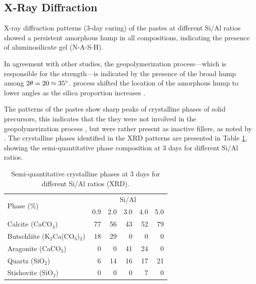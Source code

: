 \subsection{X-Ray Diffraction}

X-ray diffraction patterns (3-day curing) of the pastes at different Si/Al ratios showed a persistent amorphous hump in all compositions, indicating the presence of aluminosilicate gel (N-A-S-H).

In agreement with other studies, the geopolymerization process—which is responsible for the strength—is indicated by the presence of the broad hump among $2\theta = 20 \approx 35^{\circ}$.
process shifted the location of the amorphous hump to lower angles as the silica proportion increases \cite{arellano2014geopolymer,lee2017strength, wan2017geopolymerization}.

The patterns of the pastes show sharp peaks of crystalline phases of solid precursors, this indicates that the they were not involved in the geopolymerization process \cite{Geraldo2020}, but were rather present as inactive fillers, as noted by \cite{ruiz2012alkaline}.
The crystalline phases identified in the XRD patterns are presented in Table \ref{tab:xrd_phases_pastes}, showing the semi-quantitative phase composition at 3 days for different Si/Al ratios.

\begin{table}[H]
    \centering
    \caption{Semi-quantitative crystalline phases at 3 days for different Si/Al ratios (XRD).}
    \label{tab:xrd_phases_pastes}
    \begin{tabular}{lrrrrr}
        \hline
        \multirow{2}{*}{Phase (\%)} &
        \multicolumn{5}{c}{Si/Al}\\
        \cline{2-6}
        & 0.9 & 2.0 & 3.0 & 4.0 & 5.0 \\
        \hline
        Calcite (CaCO$_3$) & 77 & 56 & 43 & 52 & 79 \\
        Butschliite (K$_2$Ca(CO$_3$)$_2$) & 18 & 29 & 0 & 0 & 0 \\
        Aragonite (CaCO$_3$) & 0 & 0 & 41 & 24 & 0 \\
        Quartz (SiO$_2$) & 6 & 14 & 16 & 17 & 21 \\
        Stishovite (SiO$_2$) & 0 & 0 & 0 & 7 & 0 \\
        \hline
    \end{tabular}
\end{table}

